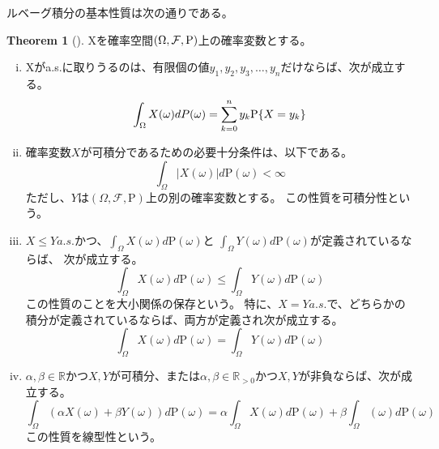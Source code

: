 \documentclass{ltjsarticle}
\numberwithin{equation}{subsection}
\theoremstyle{definition}
\newtheorem{thm}[dfn]{Theorem}
\begin{document}
ルベーグ積分の基本性質は次の通りである。
\begin{thm}[]
    Xを確率空間$\qty(\Omega , \mathcal{F}, \mathrm{P})$上の確率変数とする。
    \begin{enumerate}[(i)]
        \item Xがa.s.に取りうるのは、有限個の値$y_1, y_2, y_3, \dots , y_n$だけならば、次が成立する。
        \begin{equation}
            \int_{\Omega} X(\omega) dP(\omega) = \sum_{k=0}^{n} y_k \mathrm{P} \qty{X=y_k}
        \end{equation}
        \item 確率変数$X$が可積分であるための必要十分条件は、以下である。
        \begin{equation}
            \int_{\Omega} |X(\omega)| d \mathrm{P}(\omega) < \infty
        \end{equation}
        ただし、$Y$は$(\Omega , \mathcal{F} , \mathrm{P})$上の別の確率変数とする。
        この性質を可積分性という。
        \item $X \leq Y a.s.$かつ、$\int_{\Omega} X(\omega ) d \mathrm{P} (\omega )$と
        $\int_{\Omega} Y(\omega ) d \mathrm{P} (\omega )$が定義されているならば、
        次が成立する。
        \begin{equation}
            \int_{\Omega} X(\omega ) d \mathrm{P} (\omega ) \leq \int_{\Omega} Y(\omega ) d \mathrm{P} (\omega )
        \end{equation}
        この性質のことを大小関係の保存という。
        特に、$X=Y a.s.$で、どちらかの積分が定義されているならば、両方が定義され次が成立する。
        \begin{equation}
            \int_{\Omega} X(\omega ) d \mathrm{P} (\omega ) = \int_{\Omega} Y(\omega ) d \mathrm{P} (\omega )
        \end{equation}
        \item $\alpha ,\beta \in \mathbb{R}$かつ$X,Y$が可積分、または$\alpha ,\beta \in \mathbb{R}_{>0}$かつ$X , Y$が非負ならば、次が成立する。
        \begin{equation}
            \int_{\Omega} (\alpha X(\omega) + \beta Y(\omega)) d \mathrm{P} (\omega ) = \alpha \int_{\Omega} X(\omega) d \mathrm{P} (\omega) + \beta \int_{\Omega} (\omega) d\mathrm{P} (\omega)
        \end{equation}
        この性質を線型性という。
    \end{enumerate}
\end{thm}
\end{document}
